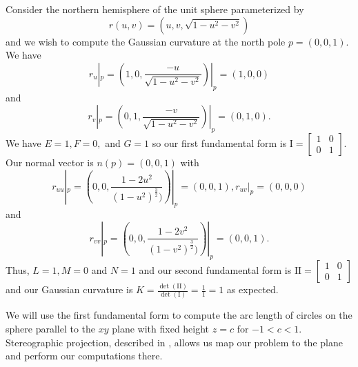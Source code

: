\begin{example}\label{ex:compute-surface-curvature}
Consider the northern hemisphere of the unit sphere parameterized
by $$r(u,v)=(u,v,\sqrt{1-u^2-v^2})$$ and we wish to compute the Gaussian curvature at
the north pole $p=(0,0,1)$.
We have $$r_u|_p=(1,0,\frac{-u}{\sqrt{1-u^2-v^2}})|_p=(1,0,0)$$ and
$$r_v|_p=(0,1,\frac{-v}{\sqrt{1-u^2-v^2}})|_p=(0,1,0).$$
We have $E=1, F=0,$ and $G=1$ so our first fundamental form is
$\mathrm{I}=\begin{bmatrix}
1 & 0 \\
0 & 1 
\end{bmatrix}.$
Our normal vector is $n(p)=(0,0,1)$ with 
$$r_{uu}|_p=(0,0,\frac{1-2u^2}{(1-u^2)^{\frac{3}{2}})})|_p=(0,0,1),
r_{uv}|_p=(0,0,0)$$ and 
$$r_{vv}|_p=(0,0,\frac{1-2v^2}{(1-v^2)^{\frac{3}{2}})})|_p=(0,0,1).$$
Thus, $L=1, M=0$ and $N=1$ and our second fundamental form is
$\mathrm{I\!I}=\begin{bmatrix}
1 & 0 \\
0 & 1 
\end{bmatrix}$
and our Gaussian curvature is $K=\frac{\det(\mathrm{I\!I})}{\det(\mathrm{I})}=\frac{1}{1}=1$ as expected.

\end{example}

We will use the first fundamental form to compute
the arc length of circles on the sphere parallel to the $xy$ plane with fixed height $z=c$ for $-1<c<1$.
Stereographic projection, described in ,
allows us map our problem to the plane and perform our computations there.

